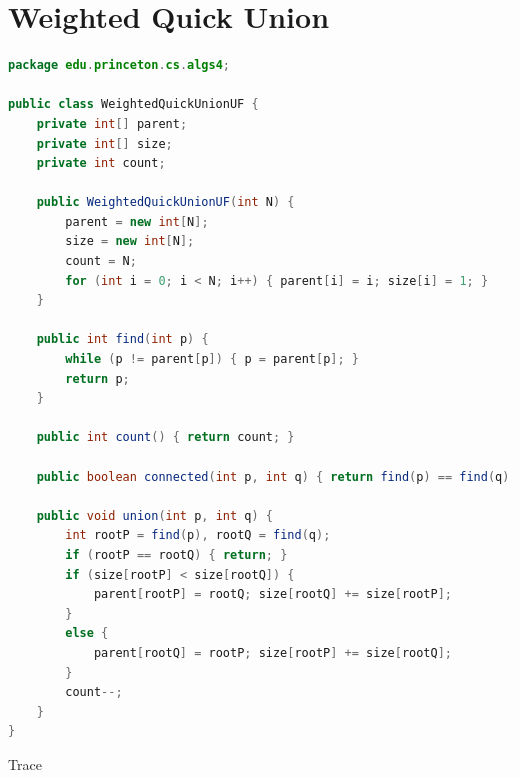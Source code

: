 \documentclass[8pt,a4paper,compress]{beamer}
\begin{document}
\section{Weighted Quick Union}
\begin{frame}[fragile]
\pause

\begin{lstlisting}[language=Java]
package edu.princeton.cs.algs4;

public class WeightedQuickUnionUF {
    private int[] parent;
    private int[] size;
    private int count;

    public WeightedQuickUnionUF(int N) {
        parent = new int[N];
        size = new int[N];
        count = N;
        for (int i = 0; i < N; i++) { parent[i] = i; size[i] = 1; }
    }

    public int find(int p) {
        while (p != parent[p]) { p = parent[p]; }
        return p;
    }

    public int count() { return count; }
  
    public boolean connected(int p, int q) { return find(p) == find(q); }

    public void union(int p, int q) {
        int rootP = find(p), rootQ = find(q);
        if (rootP == rootQ) { return; }
        if (size[rootP] < size[rootQ]) {
            parent[rootP] = rootQ; size[rootQ] += size[rootP];
        }
        else {
            parent[rootQ] = rootP; size[rootP] += size[rootQ];
        }
        count--;
    }
}
\end{lstlisting}
\end{frame}

\begin{frame}[fragile]
\pause

Trace

\begin{center}
\end{center}
\end{frame}
\end{document}
